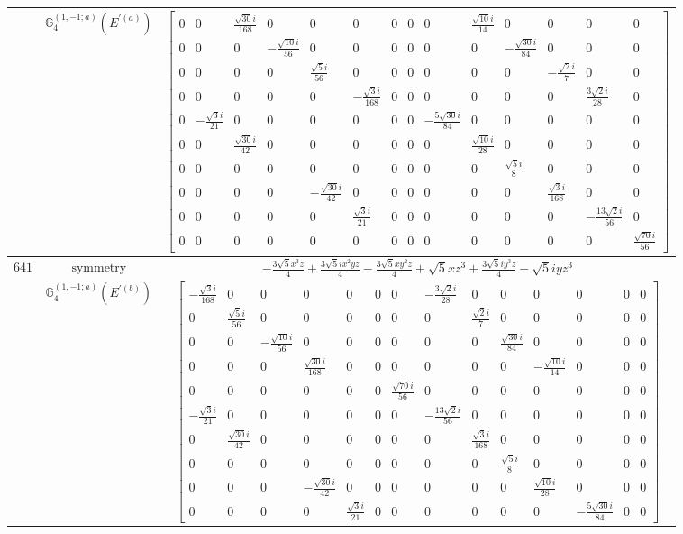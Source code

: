 \documentclass[fleqn,8pt,landscape]{jsarticle}
\begin{document}
\begin{longtable}{ccc}
$  $ & $ \mathbb{G}_{4}^{(1,-1;a)}(E^{\prime(a)}) $ & $ \begin{bmatrix} 0 & 0 & \frac{\sqrt{30} i}{168} & 0 & 0 & 0 & 0 & 0 & 0 & \frac{\sqrt{10} i}{14} & 0 & 0 & 0 & 0 \\ 0 & 0 & 0 & - \frac{\sqrt{10} i}{56} & 0 & 0 & 0 & 0 & 0 & 0 & - \frac{\sqrt{30} i}{84} & 0 & 0 & 0 \\ 0 & 0 & 0 & 0 & \frac{\sqrt{5} i}{56} & 0 & 0 & 0 & 0 & 0 & 0 & - \frac{\sqrt{2} i}{7} & 0 & 0 \\ 0 & 0 & 0 & 0 & 0 & - \frac{\sqrt{3} i}{168} & 0 & 0 & 0 & 0 & 0 & 0 & \frac{3 \sqrt{2} i}{28} & 0 \\ 0 & - \frac{\sqrt{3} i}{21} & 0 & 0 & 0 & 0 & 0 & 0 & - \frac{5 \sqrt{30} i}{84} & 0 & 0 & 0 & 0 & 0 \\ 0 & 0 & \frac{\sqrt{30} i}{42} & 0 & 0 & 0 & 0 & 0 & 0 & \frac{\sqrt{10} i}{28} & 0 & 0 & 0 & 0 \\ 0 & 0 & 0 & 0 & 0 & 0 & 0 & 0 & 0 & 0 & \frac{\sqrt{5} i}{8} & 0 & 0 & 0 \\ 0 & 0 & 0 & 0 & - \frac{\sqrt{30} i}{42} & 0 & 0 & 0 & 0 & 0 & 0 & \frac{\sqrt{3} i}{168} & 0 & 0 \\ 0 & 0 & 0 & 0 & 0 & \frac{\sqrt{3} i}{21} & 0 & 0 & 0 & 0 & 0 & 0 & - \frac{13 \sqrt{2} i}{56} & 0 \\ 0 & 0 & 0 & 0 & 0 & 0 & 0 & 0 & 0 & 0 & 0 & 0 & 0 & \frac{\sqrt{70} i}{56} \end{bmatrix} $ \\ \hline
$ 641 $ & $ \text{symmetry} $ & $ - \frac{3 \sqrt{5} x^{3} z}{4} + \frac{3 \sqrt{5} i x^{2} y z}{4} - \frac{3 \sqrt{5} x y^{2} z}{4} + \sqrt{5} x z^{3} + \frac{3 \sqrt{5} i y^{3} z}{4} - \sqrt{5} i y z^{3} $ \\
$  $ & $ \mathbb{G}_{4}^{(1,-1;a)}(E^{\prime(b)}) $ & $ \begin{bmatrix} - \frac{\sqrt{3} i}{168} & 0 & 0 & 0 & 0 & 0 & 0 & - \frac{3 \sqrt{2} i}{28} & 0 & 0 & 0 & 0 & 0 & 0 \\ 0 & \frac{\sqrt{5} i}{56} & 0 & 0 & 0 & 0 & 0 & 0 & \frac{\sqrt{2} i}{7} & 0 & 0 & 0 & 0 & 0 \\ 0 & 0 & - \frac{\sqrt{10} i}{56} & 0 & 0 & 0 & 0 & 0 & 0 & \frac{\sqrt{30} i}{84} & 0 & 0 & 0 & 0 \\ 0 & 0 & 0 & \frac{\sqrt{30} i}{168} & 0 & 0 & 0 & 0 & 0 & 0 & - \frac{\sqrt{10} i}{14} & 0 & 0 & 0 \\ 0 & 0 & 0 & 0 & 0 & 0 & \frac{\sqrt{70} i}{56} & 0 & 0 & 0 & 0 & 0 & 0 & 0 \\ - \frac{\sqrt{3} i}{21} & 0 & 0 & 0 & 0 & 0 & 0 & - \frac{13 \sqrt{2} i}{56} & 0 & 0 & 0 & 0 & 0 & 0 \\ 0 & \frac{\sqrt{30} i}{42} & 0 & 0 & 0 & 0 & 0 & 0 & \frac{\sqrt{3} i}{168} & 0 & 0 & 0 & 0 & 0 \\ 0 & 0 & 0 & 0 & 0 & 0 & 0 & 0 & 0 & \frac{\sqrt{5} i}{8} & 0 & 0 & 0 & 0 \\ 0 & 0 & 0 & - \frac{\sqrt{30} i}{42} & 0 & 0 & 0 & 0 & 0 & 0 & \frac{\sqrt{10} i}{28} & 0 & 0 & 0 \\ 0 & 0 & 0 & 0 & \frac{\sqrt{3} i}{21} & 0 & 0 & 0 & 0 & 0 & 0 & - \frac{5 \sqrt{30} i}{84} & 0 & 0 \end{bmatrix} $ \\ \hline

\end{longtable}
\end{document}
